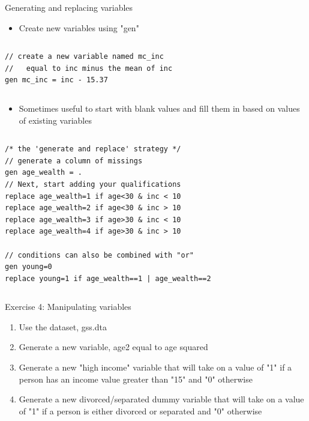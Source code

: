 \documentclass[table,smaller]{beamer}
\begin{document}
\begin{frame}[fragile,label=sec-4-5]{Generating and replacing variables}
 \begin{itemize}
\item Create new variables using "gen"
\end{itemize}
\vspace{-.5em} \begin{columns}  \begin{block}{}
\begin{verbatim}
// create a new variable named mc_inc
//   equal to inc minus the mean of inc
gen mc_inc = inc - 15.37
\end{verbatim}

\end{block} \end{columns}

\begin{itemize}
\item Sometimes useful to start with blank values and fill them in based on values of existing variables
\end{itemize}

\vspace{-.5em} \begin{columns}  \begin{block}{}
\begin{verbatim}
/* the 'generate and replace' strategy */ 
// generate a column of missings
gen age_wealth = .
// Next, start adding your qualifications
replace age_wealth=1 if age<30 & inc < 10
replace age_wealth=2 if age<30 & inc > 10
replace age_wealth=3 if age>30 & inc < 10
replace age_wealth=4 if age>30 & inc > 10

// conditions can also be combined with "or"
gen young=0
replace young=1 if age_wealth==1 | age_wealth==2
\end{verbatim}

\end{block} \end{columns}
\end{frame}

\begin{frame}[label=sec-4-6]{Exercise 4: Manipulating variables}
\begin{enumerate}
\item Use the dataset, gss.dta
\item Generate a new variable, age2 equal to age squared
\item Generate a new "high income" variable that will take on a value of "1" if a person has an income value greater than "15" and "0" otherwise
\item Generate a new divorced/separated dummy variable that will take on a value of "1" if a person is either divorced or separated and "0" otherwise
\end{enumerate}
\end{frame}
\end{document}
